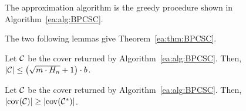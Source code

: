 The approximation algorithm is the greedy procedure shown in Algorithm~\ref{ea:alg:BPCSC}.

The two following lemmas give Theorem~\ref{ea:thm:BPCSC}.
\begin{lemma}\label{ea:lem:BPCSC-cost}
    Let $\mathcal{C}$ be the cover returned by Algorithm~\ref{ea:alg:BPCSC}. Then, $\mathopen{}\left| \mathcal{C} \right| \leq \mathopen{}\left( \sqrt{m\cdot H_n}+1 \right)\cdot b$.
\end{lemma}
\begin{lemma}\label{ea:lem:BPCSC-coverage}
    Let $\mathcal{C}$ be the cover returned by Algorithm~\ref{ea:alg:BPCSC}. Then, $\mathopen{}\left| \operatorname{cov}\mathopen{}\left( \mathcal{C} \right) \right| \geq \mathopen{}\left| \operatorname{cov}\mathopen{}\left( \mathcal{C}^{*} \right) \right|$.
\end{lemma}

